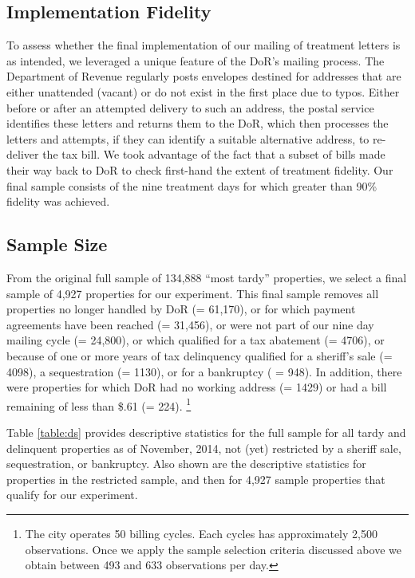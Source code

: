 \documentclass[12pt,titlepage]{article}
\begin{document}
\subsection{Implementation Fidelity}

To assess whether the final implementation of our mailing of treatment
letters is as intended, we leveraged a unique feature of the DoR's
mailing process.  The Department of Revenue regularly posts envelopes
destined for addresses that are either unattended (vacant) or do not
exist in the first place due to typos. Either before or after an
attempted delivery to such an address, the postal service identifies
these letters and returns them to the DoR, which then processes the
letters and attempts, if they can identify a suitable alternative
address, to re-deliver the tax bill. We took advantage of the fact
that a subset of bills made their way back to DoR to check first-hand
the extent of treatment fidelity. Our final sample consists of the
nine treatment days for which greater than 90\% fidelity was achieved.

\subsection{Sample Size}

From the original full sample of 134,888 ``most tardy'' properties, we select a
final sample of 4,927 properties for our experiment.  This final
sample removes all properties no longer handled by DoR (= 61,170), or
for which payment agreements have been reached (= 31,456), or were not
part of our nine day mailing cycle (= 24,800), or which qualified for a 
tax abatement (= 4706), or because of one or more years of tax delinquency 
qualified for a sheriff’s sale (= 4098), a sequestration (= 1130), or for 
a bankruptcy ( = 948).  In addition, there were properties for which DoR had 
no working address (= 1429) or had a bill remaining of less than \$.61 (= 224).
\footnote{The city operates 50 billing cycles. Each cycles has
  approximately 2,500 observations.  Once we apply the sample
  selection criteria discussed above we obtain between 493 and 633
  observations per day.}


Table \ref{table:ds} provides descriptive statistics for the full sample 
for all tardy and delinquent properties as of November, 2014, not (yet) 
restricted by a sheriff sale, sequestration, or bankruptcy.   Also shown 
are the descriptive statistics for properties in the restricted sample, 
and then for  4,927 sample properties that qualify for our experiment.
\end{document}
